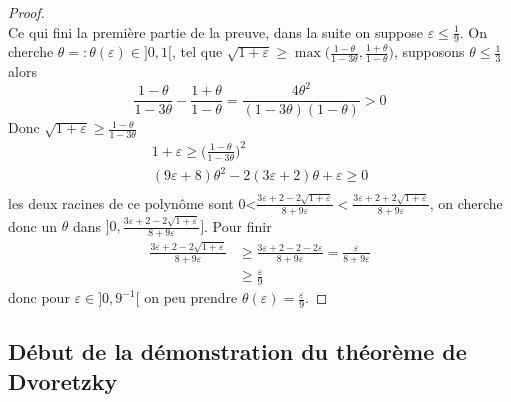 \documentclass[12pt]{article}
\begin{document}
\begin{proof}
\begin{equation*}
	\end{equation*}
	Ce qui fini la première partie de la preuve, dans la suite on suppose $\varepsilon\leq \frac{1}{9}$. On cherche $\theta=:\theta(\varepsilon)\in]0,1[$, tel que $\sqrt{1+\varepsilon}\geq \max\big(\frac{1-\theta}{1-3\theta},\frac{1+\theta}{1-\theta}\big)$, supposons $\theta\leq \frac{1}{3}$ alors
	\begin{equation*}
	\frac{1-\theta}{1-3\theta}-\frac{1+\theta}{1-\theta} = \frac{4\theta^2}{(1-3\theta) (1-\theta)}>0
	\end{equation*}
	Donc $\sqrt{1+\varepsilon}\geq \frac{1-\theta}{1-3\theta}$
	\begin{equation*}
	\begin{array}{ccc}
	1+\varepsilon \geq  \big(\frac{1-\theta}{1-3\theta}\big)^2\\
	(9\varepsilon+8)\theta^2 - 2(3\varepsilon+2)\theta +\varepsilon \geq 0\\
	\end{array}
	\end{equation*}
	les deux racines de ce polynôme sont 0<$\frac{3\varepsilon+2-2\sqrt{1+\varepsilon}}{8+9\varepsilon}<\frac{3\varepsilon+2+2\sqrt{1+\varepsilon}}{8+9\varepsilon}$, on cherche donc un $\theta$ dans $]0,\frac{3\varepsilon+2-2\sqrt{1+\varepsilon}}{8+9\varepsilon}]$. Pour finir 
	\begin{align*}
	\frac{3\varepsilon+2-2\sqrt{1+\varepsilon}}{8+9\varepsilon}&\geq \frac{3\varepsilon+2-2-2\varepsilon}{8+9\varepsilon}=\frac{\varepsilon}{8+9\varepsilon}\\
	&\geq \frac{\varepsilon}{9}
	\end{align*}
	donc pour $\varepsilon\in]0,9^{-1}[$ on peu prendre $\theta(\varepsilon)=\frac{\varepsilon}{9}$.
\end{proof}
\subsection{Début de la démonstration du théorème de Dvoretzky}
\end{document}
